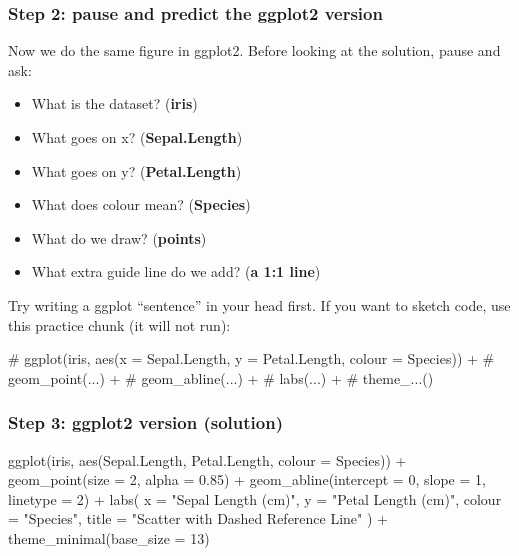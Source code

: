 \documentclass[
  letterpaper,
  DIV=11,
  numbers=noendperiod]{scrartcl}
\newenvironment{Shaded}{\begin{snugshade}}{\end{snugshade}}
\newcommand{\AttributeTok}[1]{\textcolor[rgb]{0.40,0.45,0.13}{#1}}
\newcommand{\CommentTok}[1]{\textcolor[rgb]{0.37,0.37,0.37}{#1}}
\newcommand{\DecValTok}[1]{\textcolor[rgb]{0.68,0.00,0.00}{#1}}
\newcommand{\FloatTok}[1]{\textcolor[rgb]{0.68,0.00,0.00}{#1}}
\newcommand{\FunctionTok}[1]{\textcolor[rgb]{0.28,0.35,0.67}{#1}}
\newcommand{\NormalTok}[1]{\textcolor[rgb]{0.00,0.23,0.31}{#1}}
\newcommand{\SpecialCharTok}[1]{\textcolor[rgb]{0.37,0.37,0.37}{#1}}
\newcommand{\StringTok}[1]{\textcolor[rgb]{0.13,0.47,0.30}{#1}}
\providecommand{\tightlist}{%
  \setlength{\itemsep}{0pt}\setlength{\parskip}{0pt}}\usepackage{longtable,booktabs,array}
\begin{document}
\subsubsection{Step 2: pause and predict the ggplot2
version}\label{step-2-pause-and-predict-the-ggplot2-version}

Now we do the same figure in ggplot2. Before looking at the solution,
pause and ask:

\begin{itemize}
\tightlist
\item
  What is the dataset? (\textbf{iris})
\item
  What goes on x? (\textbf{Sepal.Length})
\item
  What goes on y? (\textbf{Petal.Length})
\item
  What does colour mean? (\textbf{Species})
\item
  What do we draw? (\textbf{points})
\item
  What extra guide line do we add? (\textbf{a 1:1 line})
\end{itemize}

Try writing a ggplot ``sentence'' in your head first. If you want to
sketch code, use this practice chunk (it will not run):

\begin{Shaded}
\begin{Highlighting}[]
\CommentTok{\# ggplot(iris, aes(x = Sepal.Length, y = Petal.Length, colour = Species)) +}
\CommentTok{\#   geom\_point(...) +}
\CommentTok{\#   geom\_abline(...) +}
\CommentTok{\#   labs(...) +}
\CommentTok{\#   theme\_...()}
\end{Highlighting}
\end{Shaded}

\subsubsection{Step 3: ggplot2 version
(solution)}\label{step-3-ggplot2-version-solution}

\begin{Shaded}
\begin{Highlighting}[]
\FunctionTok{ggplot}\NormalTok{(iris, }\FunctionTok{aes}\NormalTok{(Sepal.Length, Petal.Length, }\AttributeTok{colour =}\NormalTok{ Species)) }\SpecialCharTok{+}
  \FunctionTok{geom\_point}\NormalTok{(}\AttributeTok{size =} \DecValTok{2}\NormalTok{, }\AttributeTok{alpha =} \FloatTok{0.85}\NormalTok{) }\SpecialCharTok{+}
  \FunctionTok{geom\_abline}\NormalTok{(}\AttributeTok{intercept =} \DecValTok{0}\NormalTok{, }\AttributeTok{slope =} \DecValTok{1}\NormalTok{, }\AttributeTok{linetype =} \DecValTok{2}\NormalTok{) }\SpecialCharTok{+}
  \FunctionTok{labs}\NormalTok{(}
    \AttributeTok{x =} \StringTok{"Sepal Length (cm)"}\NormalTok{,}
    \AttributeTok{y =} \StringTok{"Petal Length (cm)"}\NormalTok{,}
    \AttributeTok{colour =} \StringTok{"Species"}\NormalTok{,}
    \AttributeTok{title =} \StringTok{"Scatter with Dashed Reference Line"}
\NormalTok{  ) }\SpecialCharTok{+}
  \FunctionTok{theme\_minimal}\NormalTok{(}\AttributeTok{base\_size =} \DecValTok{13}\NormalTok{)}
\end{Highlighting}
\end{Shaded}
\end{document}

